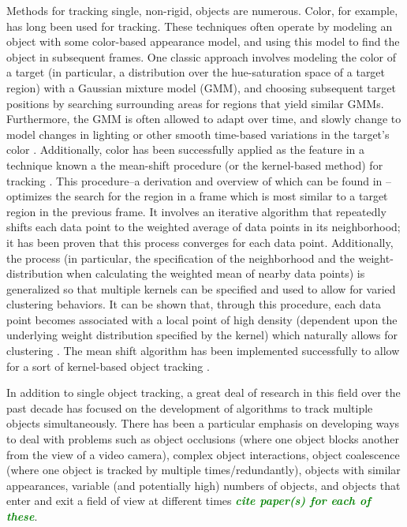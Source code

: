 \documentclass[smallcondensed, final]{svjour3}
\newcommand{\willie}[1]{\textcolor{green}{\textsf{\emph{\textbf{\textcolor{green}{#1}}}}}}
\begin{document}
Methods for tracking single, non-rigid, objects are numerous. Color, for example, has long been used for tracking. These techniques often operate by modeling an object with some color-based appearance model, and using this model to find the object in subsequent frames. One classic approach involves modeling the color of a target (in particular, a distribution over the hue-saturation space of a target region) with a Gaussian mixture model (GMM), and choosing subsequent target positions by searching surrounding areas for regions that yield similar GMMs. Furthermore, the GMM is often allowed to adapt over time, and slowly change to model changes in lighting or other smooth time-based variations in the target's color \citep{raja_1998, mckenna_1999, jepson_2003}. Additionally, color has been successfully applied as the feature in a technique known a the mean-shift procedure (or the kernel-based method) for tracking \citep{comaniciu_2003, perez_2002, nummiaro_2003, lee_2011}. This procedure--a derivation and overview of which can be found in \citep{fukunaga_1975, cheng_1995}--optimizes the search for the region in a frame which is most similar to a target region in the previous frame. It involves an iterative algorithm that repeatedly shifts each data point to the weighted average of data points in its neighborhood; it has been proven that this process converges for each data point. Additionally, the process (in particular, the specification of the neighborhood and the weight-distribution when calculating the weighted mean of nearby data points) is generalized so that multiple kernels can be specified and used to allow for varied clustering behaviors. It can be shown that, through this procedure, each data point becomes associated with a local point of high density (dependent upon the underlying weight distribution specified by the kernel) which naturally allows for clustering \citep{cheng_1995}. The mean shift algorithm has been implemented successfully to allow for a sort of kernel-based object tracking \citep{comaniciu_2003, comaniciu_1999, comaniciu_2000}.

In addition to single object tracking, a great deal of research in this field over the past decade has focused on the development of algorithms to track multiple objects simultaneously. There has been a particular emphasis on developing ways to deal with problems such as object occlusions (where one object blocks another from the view of a video camera), complex object interactions, object coalescence (where one object is tracked by multiple times/redundantly), objects with similar appearances, variable (and potentially high) numbers of objects, and objects that enter and exit a field of view at different times \willie{cite paper(s) for each of these}.
\end{document}
